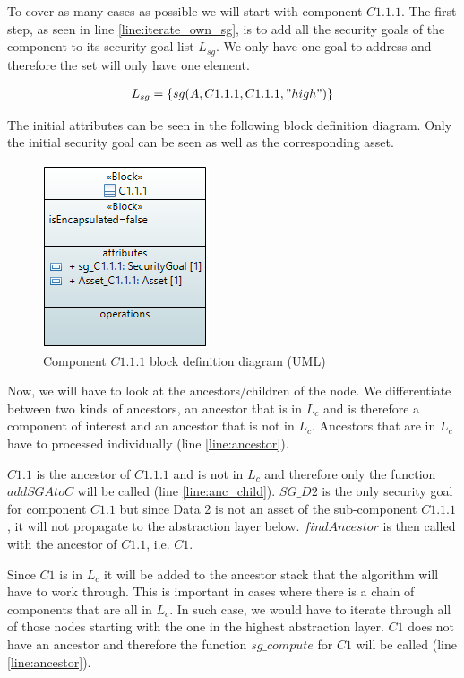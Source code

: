 To cover as many cases as possible we will start with component $C1.1.1$. The first step, as seen in line \ref{line:iterate_own_sg}, is to add all the security goals of the component to its security goal list $L_{sg}$. We only have one goal to address and therefore the set will only have one element.

\begin{align*}
L_{sg} = \{sg(A,C1.1.1,C1.1.1,"high")\}
\end{align*}

The initial attributes can be seen in the following block definition diagram. Only the initial security goal can be seen as well as the corresponding asset.

\begin{figure}[H]
\centering
        \includegraphics[scale=0.9]{pictures/block_c111}
    \caption{Component $C1.1.1$ block definition diagram (UML)}
\end{figure}

Now, we will have to look at the ancestors/children of the node. We differentiate between two kinds of ancestors, an ancestor that is in $L_c$ and is therefore a component of interest and an ancestor that is not in $L_c$. Ancestors that are in $L_c$ have to processed individually (line \ref{line:ancestor}).

$C1.1$ is the ancestor of $C1.1.1$ and is not in $L_c$ and therefore only the function $addSGAtoC$ will be called (line \ref{line:anc_child}). $SG\_D2$ is the only security goal for component $C1.1$ but since Data 2 is not an asset of the sub-component $C1.1.1$, it will not propagate to the abstraction layer below. $findAncestor$ is then called with the ancestor of $C1.1$, i.e. $C1$.

Since $C1$ is in $L_c$ it will be added to the ancestor stack that the algorithm will have to work through. This is important in cases where there is a chain of components that are all in $L_c$. In such case, we would have to iterate through all of those nodes starting with the one in the highest abstraction layer. $C1$ does not have an ancestor and therefore the function $sg\_compute$ for $C1$ will be called (line \ref{line:ancestor}).

